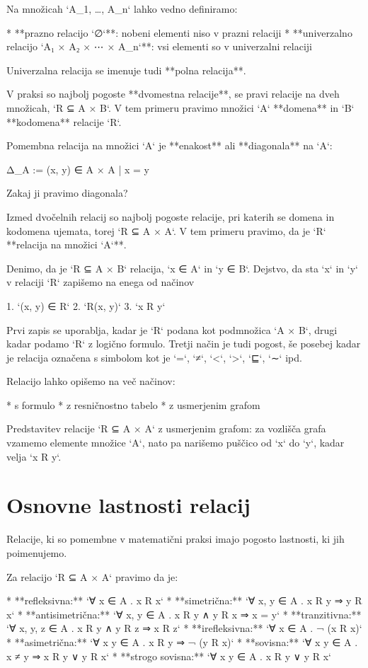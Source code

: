 Na množicah `A_1, …, A_n` lahko vedno definiramo:

* **prazno relacijo `∅`**: nobeni elementi niso v prazni relaciji
* **univerzalno relacijo `A₁ × A₂ × ⋯ × A_n`**: vsi elementi so v univerzalni relaciji

Univerzalna relacija se imenuje tudi **polna relacija**.

V praksi so najbolj pogoste **dvomestna relacije**, se pravi relacije na dveh
množicah, `R ⊆ A × B`. V tem primeru pravimo množici `A` **domena** in `B`
**kodomena** relacije `R`.

Pomembna relacija na množici `A` je **enakost** ali **diagonala** na `A`:

    Δ_A := { (x, y) ∈ A × A | x = y }

Zakaj ji pravimo diagonala?

Izmed dvočelnih relacij so najbolj pogoste relacije, pri katerih se domena in
kodomena ujemata, torej `R ⊆ A × A`. V tem primeru pravimo, da je `R` **relacija
na množici `A`**.

Denimo, da je `R ⊆ A × B` relacija, `x ∈ A` in `y ∈ B`. Dejstvo, da sta `x` in
`y` v relaciji `R` zapišemo na enega od načinov

1. `(x, y) ∈ R`
2. `R(x, y)`
3. `x R y`

Prvi zapis se uporablja, kadar je `R` podana kot podmnožica `A × B`, drugi kadar
podamo `R` z logično formulo. Tretji način je tudi pogost, še posebej kadar je
relacija označena s simbolom kot je `=`, `≠`, `<`, `>`, `⊑`, `∼` ipd.

Relacijo lahko opišemo na več načinov:

* s formulo
* z resničnostno tabelo
* z usmerjenim grafom

Predstavitev relacije `R ⊆ A × A` z usmerjenim grafom: za vozlišča grafa vzamemo
elemente množice `A`, nato pa narišemo puščico od `x` do `y`, kadar velja `x R y`.

\section{Osnovne lastnosti relacij}

Relacije, ki so pomembne v matematični praksi imajo pogosto lastnosti, ki jih poimenujemo.

Za relacijo `R ⊆ A × A` pravimo da je:

* **refleksivna:** `∀ x ∈ A . x R x`
* **simetrična:** `∀ x, y ∈ A . x R y ⇒ y R x`
* **antisimetrična:** `∀ x, y ∈ A . x R y ∧ y R x ⇒ x = y`
* **tranzitivna:** `∀ x, y, z ∈ A . x R y ∧ y R z ⇒ x R z`
* **irefleksivna:** `∀ x ∈ A . ¬ (x R x)`
* **asimetrična:** `∀ x y ∈ A . x R y ⇒ ¬ (y R x)`
* **sovisna:** `∀ x y ∈ A . x ≠ y ⇒ x R y ∨ y R x`
* **strogo sovisna:** `∀ x y ∈ A . x R y ∨ y R x`

